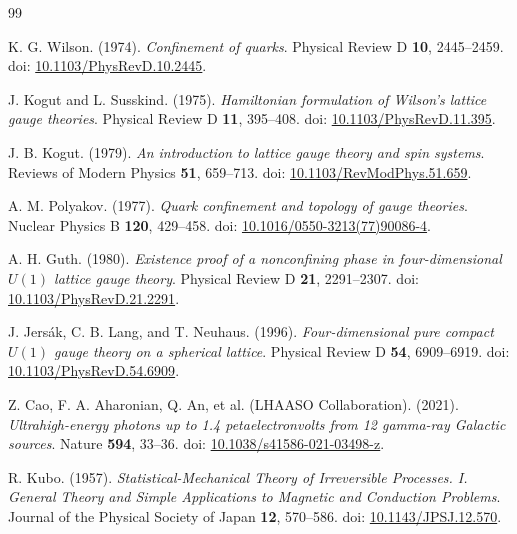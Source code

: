     \ifresearchtrackincluded\else
\begin{thebibliography}{99}
        
        K. G. Wilson. (1974).
        \textit{Confinement of quarks}.
        Physical Review D \textbf{10}, 2445--2459.
        doi: \href{https://doi.org/10.1103/PhysRevD.10.2445}{10.1103/PhysRevD.10.2445}.

        J. Kogut and L. Susskind. (1975).
        \textit{Hamiltonian formulation of Wilson's lattice gauge theories}.
        Physical Review D \textbf{11}, 395--408.
        doi: \href{https://doi.org/10.1103/PhysRevD.11.395}{10.1103/PhysRevD.11.395}.

        J. B. Kogut. (1979).
        \textit{An introduction to lattice gauge theory and spin systems}.
        Reviews of Modern Physics \textbf{51}, 659--713.
        doi: \href{https://doi.org/10.1103/RevModPhys.51.659}{10.1103/RevModPhys.51.659}.

        A. M. Polyakov. (1977).
        \textit{Quark confinement and topology of gauge theories}.
        Nuclear Physics B \textbf{120}, 429--458.
        doi: \href{https://doi.org/10.1016/0550-3213(77)90086-4}{10.1016/0550-3213(77)90086-4}.

        A. H. Guth. (1980).
        \textit{Existence proof of a nonconfining phase in four-dimensional
        \(U(1)\) lattice gauge theory}.
        Physical Review D \textbf{21}, 2291--2307.
        doi: \href{https://doi.org/10.1103/PhysRevD.21.2291}{10.1103/PhysRevD.21.2291}.

        J. Jers\'ak, C. B. Lang, and T. Neuhaus. (1996).
        \textit{Four-dimensional pure compact \(U(1)\) gauge theory on a spherical lattice}.
        Physical Review D \textbf{54}, 6909--6919.
        doi: \href{https://doi.org/10.1103/PhysRevD.54.6909}{10.1103/PhysRevD.54.6909}.

        Z. Cao, F. A. Aharonian, Q. An, et al. (LHAASO Collaboration). (2021).
        \textit{Ultrahigh-energy photons up to 1.4 petaelectronvolts from 12
        gamma-ray Galactic sources}.
        Nature \textbf{594}, 33--36.
        doi: \href{https://doi.org/10.1038/s41586-021-03498-z}{10.1038/s41586-021-03498-z}.

        R. Kubo. (1957).
        \textit{Statistical-Mechanical Theory of Irreversible Processes. I. General Theory and Simple Applications to Magnetic and Conduction Problems}.
        Journal of the Physical Society of Japan \textbf{12}, 570--586.
        doi: \href{https://doi.org/10.1143/JPSJ.12.570}{10.1143/JPSJ.12.570}.
        

\end{thebibliography}
